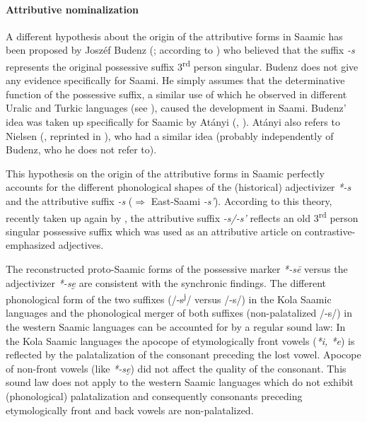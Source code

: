 {\paragraph{Attributive nominalization} A different hypothesis about the origin of the attributive forms in Saamic has been proposed by Joszéf Budenz (\citeyear{budenz1870}; according to \citealt{atanyi1942,atanyi1943}) who believed that the suffix \textit{-s} represents the original possessive suffix 3\textsuperscript{rd} person singular. Budenz does not give any evidence specifically for Saami. He simply assumes that the determinative function of the possessive suffix, a similar use of which he observed in different Uralic and Turkic languages (see ), caused the development in Saami. Budenz' idea was taken up specifically for Saamic by Atányi (\citeyear{atanyi1942}, \citeyear{atanyi1943}). Atányi also refers to Nielsen (\citeyear{nielsen1933}, reprinted in \citealt{nielsen1945b}), who had a similar idea (probably independently of Budenz, who he does not refer to).

This hypothesis on the origin of the attributive forms in Saamic perfectly accounts for the different phonological shapes of the (historical) adjectivizer \mbox{\textit{*-s}} and the attributive suffix \textit{-s} ($\Rightarrow$ East-Saami \textit{-s'}). According to this theory, recently taken up again by \cite{riesler2006b}, the attributive suffix \textit{-s/-s'} reflects an old 3\textsuperscript{rd} person singular possessive suffix which was used as an attributive article on contrastive-emphasized adjectives.

The reconstructed proto-Saamic forms of the possessive marker \textit{*-sē} \cite[73]{sammallahti1998b} versus the adjectivizer \textit{*-se̮} are consistent with the synchronic findings. The different phonological form of the two suffixes (/-s\textsuperscript{j}/ versus /-s/) in the Kola Saamic languages and the phonological merger of both suffixes (non-palatalized /-s/) in the western Saamic languages can be accounted for by a regular sound law: In the Kola Saamic languages the apocope of etymologically front vowels (\textit{*i, *e}) is reflected by the palatalization of the consonant preceding the lost vowel. Apocope of non-front vowels (like \textit{*-se̮}) did not affect the quality of the consonant. This sound law does not apply to the western Saamic languages which do not exhibit (phonological) palatalization and consequently consonants preceding etymologically front and back vowels are non-palatalized.

}
